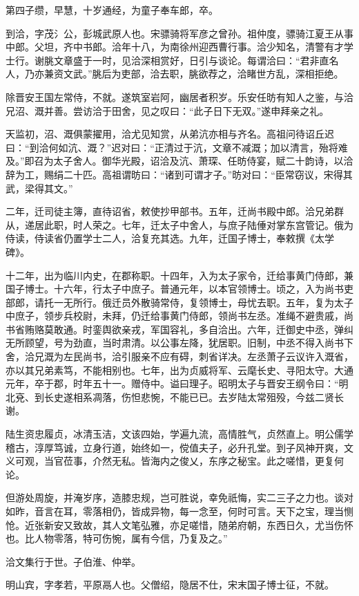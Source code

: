 \documentclass[12pt,UTF8]{ctexbook}
\begin{document}
第四子缵，早慧，十岁通经，为童子奉车郎，卒。

到洽，字茂氵公，彭城武原人也。宋骠骑将军彦之曾孙。祖仲度，骠骑江夏王从事中郎。父坦，齐中书郎。洽年十八，为南徐州迎西曹行事。洽少知名，清警有才学士行。谢朓文章盛于一时，见洽深相赏好，日引与谈论。每谓洽曰：“君非直名人，乃亦兼资文武。”朓后为吏部，洽去职，朓欲荐之，洽睹世方乱，深相拒绝。

除晋安王国左常侍，不就。遂筑室岩阿，幽居者积岁。乐安任昉有知人之鉴，与洽兄沼、溉并善。尝访洽于田舍，见之叹曰：“此子日下无双。”遂申拜亲之礼。

天监初，沼、溉俱蒙擢用，洽尤见知赏，从弟沆亦相与齐名。高祖问待诏丘迟曰：“到洽何如沆、溉？”迟对曰：“正清过于沆，文章不减溉；加以清言，殆将难及。”即召为太子舍人。御华光殿，诏洽及沆、萧琛、任昉侍宴，赋二十韵诗，以洽辞为工，赐绢二十匹。高祖谓昉曰：“诸到可谓才子。”昉对曰：“臣常窃议，宋得其武，梁得其文。”

二年，迁司徒主簿，直待诏省，敕使抄甲部书。五年，迁尚书殿中郎。洽兄弟群从，递居此职，时人荣之。七年，迁太子中舍人，与庶子陆倕对掌东宫管记。俄为侍读，侍读省仍置学士二人，洽复充其选。九年，迁国子博士，奉敕撰《太学碑》。

十二年，出为临川内史，在郡称职。十四年，入为太子家令，迁给事黄门侍郎，兼国子博士。十六年，行太子中庶子。普通元年，以本官领博士。顷之，入为尚书吏部郎，请托一无所行。俄迁员外散骑常侍，复领博士，母忧去职。五年，复为太子中庶子，领步兵校尉，未拜，仍迁给事黄门侍郎，领尚书左丞。准绳不避贵戚，尚书省贿赂莫敢通。时銮舆欲亲戎，军国容礼，多自洽出。六年，迁御史中丞，弹纠无所顾望，号为劲直，当时肃清。以公事左降，犹居职。旧制，中丞不得入尚书下舍，洽兄溉为左民尚书，洽引服亲不应有碍，刺省详决。左丞萧子云议许入溉省，亦以其兄弟素笃，不能相别也。七年，出为贞威将军、云麾长史、寻阳太守。大通元年，卒于郡，时年五十一。赠侍中。谥曰理子。昭明太子与晋安王纲令曰：“明北兗、到长史遂相系凋落，伤怛悲惋，不能已已。去岁陆太常殂殁，今兹二贤长谢。

陆生资忠履贞，冰清玉洁，文该四始，学遍九流，高情胜气，贞然直上。明公儒学稽古，淳厚笃诚，立身行道，始终如一，傥值夫子，必升孔堂。到子风神开爽，文义可观，当官莅事，介然无私。皆海内之俊乂，东序之秘宝。此之嗟惜，更复何论。

但游处周旋，并淹岁序，造膝忠规，岂可胜说，幸免祇悔，实二三子之力也。谈对如昨，音言在耳，零落相仍，皆成异物，每一念至，何时可言。天下之宝，理当恻怆。近张新安又致故，其人文笔弘雅，亦足嗟惜，随弟府朝，东西日久，尤当伤怀也。比人物零落，特可伤惋，属有今信，乃复及之。”

洽文集行于世。子伯淮、仲举。

明山宾，字孝若，平原鬲人也。父僧绍，隐居不仕，宋末国子博士征，不就。
\end{document}
